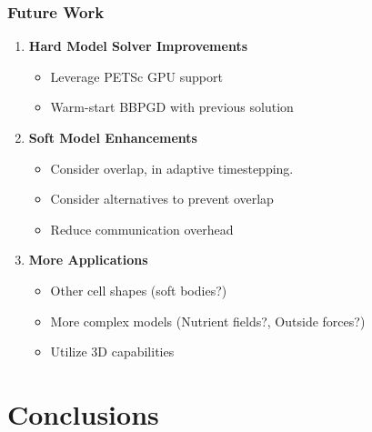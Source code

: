 \documentclass[10pt,t]{beamer}
\begin{document}
\begin{frame}
    \frametitle{Future Work}

    \begin{enumerate}
        \item \textbf{Hard Model Solver Improvements}
              \begin{itemize}
                  \item Leverage PETSc GPU support
                  \item Warm-start BBPGD with previous solution
              \end{itemize}

              \vspace{0.3cm}

        \item \textbf{Soft Model Enhancements}
              \begin{itemize}
                  \item Consider overlap, in adaptive timestepping.
                  \item Consider alternatives to prevent overlap
                  \item Reduce communication overhead
              \end{itemize}

              \vspace{0.3cm}

        \item \textbf{More Applications}
              \begin{itemize}
                  \item Other cell shapes (soft bodies?)
                  \item More complex models (Nutrient fields?, Outside forces?)
                  \item Utilize 3D capabilities
              \end{itemize}
    \end{enumerate}

\end{frame}



\section*{Conclusions}
\end{document}
